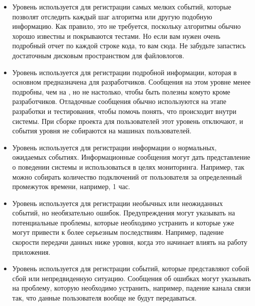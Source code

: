 \documentclass[letterpaper,10pt,russian]{sphinxmanual}
\begin{document}
\begin{itemize}
\item {} 
\sphinxAtStartPar
{}
Уровень  используется для регистрации самых мелких событий, которые позволят отследить каждый шаг алгоритма или другую подобную информацию. Как правило, это не требуется, поскольку алгоритмы обычно хорошо известны и покрываются тестами. Но если вам нужен очень подробный отчет по каждой строке кода, то вам сюда. Не забудьте запастись достаточным дисковым пространством для файлов\sphinxhyphen{}логов.

\item {} 
\sphinxAtStartPar
{}
Уровень  используется для регистрации подробной информации, которая в основном предназначена для разработчиков. Сообщения на этом уровне менее подробны, чем на , но не настолько, чтобы быть полезны кому\sphinxhyphen{}то кроме разработчиков. Отладочные сообщения обычно используются на этапе разработки и тестирования, чтобы помочь понять, что происходит внутри системы. При сборке проекта для пользователей этот уровень отключают, и события уровня  не собираются на машинах пользователей.

\item {} 
\sphinxAtStartPar
{}
Уровень  используется для регистрации информации о нормальных, ожидаемых событиях. Информационные сообщения могут дать представление о поведении системы и использоваться в целях мониторинга. Например, так можно собирать количество подключений от пользователя за определенный промежуток времени, например, 1 час.

\item {} 
\sphinxAtStartPar
{}
Уровень  используется для регистрации необычных или неожиданных событий, но необязательно ошибок. Предупреждения могут указывать на потенциальные проблемы, которые необходимо устранить и которые уже могут привести к более серьезным последствиям. Например, падение скорости передачи данных ниже уровня, когда это начинает влиять на работу приложения.

\item {} 
\sphinxAtStartPar
{}
Уровень  используется для регистрации событий, которые представляют собой сбой или непредвиденную ситуацию. Сообщения об ошибках могут указывать на проблему, которую необходимо устранить, например, падение канала связи так, что данные пользователя вообще не будут передаваться.


\end{itemize}
\end{document}
